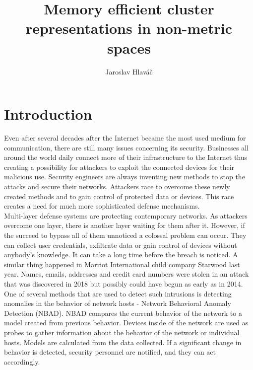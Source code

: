 \documentclass[thesis=B,english]{FITthesis}[2012/10/20]
\title{ Memory efficient cluster representations in non-metric spaces}
\author{Jaroslav Hlaváč} %
\begin{document}

\chapter{Introduction}

Even after several decades after the Internet became the most used medium for communication, there are still many issues concerning its security. Businesses all around the world daily connect more of their infrastructure to the Internet thus creating a possibility for attackers to exploit the connected devices for their malicious use. Security engineers are always inventing new methods to stop the attacks and secure their networks. Attackers race to overcome these newly created methods and to gain control of protected data or devices. This race creates a need for much more sophisticated defense mechanisms. \\

Multi-layer defense systems are protecting contemporary networks. As attackers overcome one layer, there is another layer waiting for them after it. However, if the succeed to bypass all of them unnoticed a colossal problem can occur. They can collect user credentials,  exfiltrate data or gain control of devices without anybody's knowledge. It can take a long time before the breach is noticed. A similar thing happened in Marriot International child company Starwood last year. Names, emails, addresses and credit card numbers were stolen in an attack that was discovered in 2018 but possibly could have begun as early as in 2014\cite{hron2018breaches}. \\
                                                                                                                                                                    
One of several methods that are used to detect such intrusions is detecting anomalies in the behavior of network hosts - Network Behavioral Anomaly Detection (NBAD). NBAD compares the current behavior of the network to a model created from previous behavior. Devices inside of the network are used as probes to gather information about the behavior of the network or individual hosts. Models are calculated from the data collected. If a significant change in behavior is detected, security personnel are notified, and they can act accordingly. \\
                                                                                  
\end{document}
